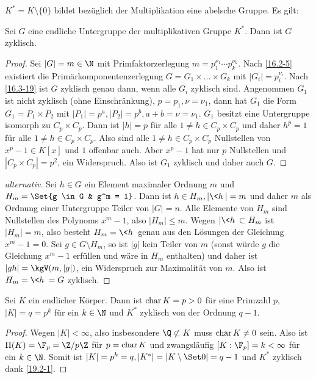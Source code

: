 $K^* = K \setminus \{0\}$ bildet bezüglich der Multiplikation eine abelsche Gruppe.
Es gilt:

\begin{st} \label{19.2-1}
	Sei $G$ eine endliche Untergruppe der multiplikativen Gruppe $K^*$.
	Dann ist $G$ zyklisch.
	\begin{proof}
		Sei $|G| = m \in \N$ mit Primfaktorzerlegung $m = p_1^{\nu_1} \dotsb p_k^{\nu_k}$.
		Nach \ref{16.2-5} existiert die Primärkomponentenzerlegung $G = G_1 \times \dotsc \times G_k$ mit $|G_i| = p_i^{\nu_i}$.
		Nach \ref{16.3-19} ist $G$ zyklisch genau dann, wenn alle $G_i$ zyklisch sind.
		Angenommen $G_1$ ist nicht zyklisch (ohne Einschränkung), $p = p_1, \nu = \nu_1$, dann hat $G_1$ die Form $G_1 = P_1 \times P_2$ mit $|P_1| = p^a, |P_2| = p^b, a + b = \nu = \nu_1$.
		$G_1$ besitzt eine Untergruppe isomorph zu $C_p \times C_p$.
		Dann ist $|h| = p$ für alle $1 \neq h \in C_p \times C_p$ und daher $h^p = 1$ für alle $1 \neq h \in C_p \times C_p$.
		Also sind alle $1 \neq h \in C_p \times C_p$ Nullstellen von $x^p - 1 \in K[x]$ und $1$ offenbar auch.
		Aber $x^p - 1$ hat nur $p$ Nullstellen und $|C_p \times C_p| = p^2$, ein Widerspruch.
		Also ist $G_1$ zyklisch und daher auch $G$.
	\end{proof}
	\begin{proof}[alternativ]
		Sei $h \in G$ ein Element maximaler Ordnung $m$ und $H_m = \Set{g \in G & g^m = 1}$.
		Dann ist $h \in H_m, |\<h\>| = m$ und daher $m$ als Ordnung einer Untergruppe Teiler von $|G| = n$.
		Alle Elemente von $H_m$ sind Nullstellen des Polynoms $x^m - 1$, also $|H_m| \le m$.
		Wegen $|\<h\> \subset H_m$ ist $|H_m| = m$, also besteht $H_m = \<h\>$ genau aus den Lösungen der Gleichung $x^m - 1 = 0$.
		Sei $g \in G \setminus H_m$, so ist $|g|$ kein Teiler von $m$ (sonst würde $g$ die Gleichung $x^m - 1$ erfüllen und wäre in $H_m$ enthalten) und daher ist $|gh| = \kgV(m, |g|)$, ein Widerspruch zur Maximalität von $m$.
		Also ist $H_m = \<h\> = G$ zyklisch.
	\end{proof}
\end{st}

\begin{st} \label{19.2-2}
	Sei $K$ ein endlicher Körper.
	Dann ist $\operatorname{char} K = p > 0$ für eine Primzahl $p$, $|K| = q = p^k$ für ein $k \in \N$ und $K^*$ zyklisch von der Ordnung $q - 1$.
	\begin{proof}
		Wegen $|K| < \infty$, also insbesondere $\Q \not\subset K$ muss $\operatorname{char} K \neq 0$ sein.
		Also ist $\Pi(K) = \F_p = \Z / p\Z$ für $p = \operatorname{char} K$ und zwangsläufig $[K:\F_p] = k < \infty$ für ein $k \in \N$.
		Somit ist $|K| = p^k = q, |K^*| = |K \setminus \Set 0| = q-1$ und $K^*$ zyklisch dank \ref{19.2-1}.
	\end{proof}
\end{st}

